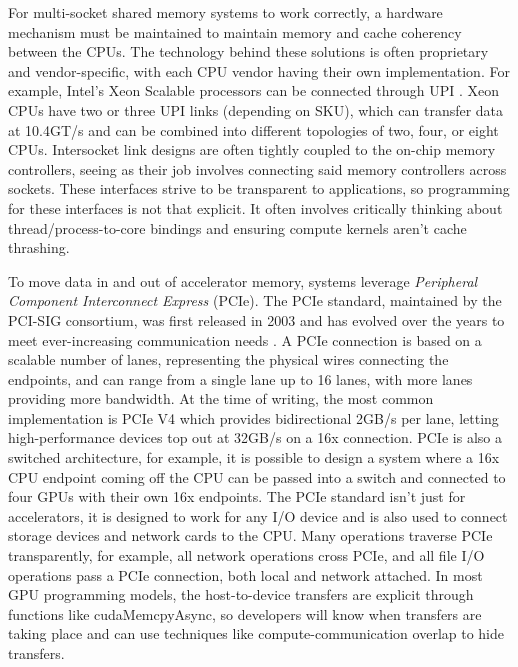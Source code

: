 For multi-socket shared memory systems to work correctly, a hardware mechanism must be maintained to maintain memory and cache coherency between the CPUs.  
The technology behind these solutions is often proprietary and vendor-specific, with each CPU vendor having their own implementation.
For example, Intel's Xeon Scalable processors can be connected through UPI \cite{XeonTechOverview}.
Xeon CPUs have two or three UPI links (depending on SKU), which can transfer data at 10.4GT/s and can be combined into different topologies of two, four, or eight CPUs.
Intersocket link designs are often tightly coupled to the on-chip memory controllers, seeing as their job involves connecting said memory controllers across sockets.
These interfaces strive to be transparent to applications, so programming for these interfaces is not that explicit. 
It often involves critically thinking about thread/process-to-core bindings and ensuring compute kernels aren't cache thrashing.

To move data in and out of accelerator memory, systems leverage \textit{Peripheral Component Interconnect Express} (PCIe).
The PCIe standard, maintained by the PCI-SIG consortium, was first released in 2003 and has evolved over the years to meet ever-increasing communication needs \cite{PCIeIntroPaper, PCIeV5Spec}.
A PCIe connection is based on a scalable number of lanes, representing the physical wires connecting the endpoints, and can range from a single lane up to 16 lanes, with more lanes providing more bandwidth.
At the time of writing, the most common implementation is PCIe V4 which provides bidirectional 2GB/s per lane, letting high-performance devices top out at 32GB/s on a 16x connection. 
PCIe is also a switched architecture, for example, it is possible to design a system where a 16x CPU endpoint coming off the CPU can be passed into a switch and connected to four GPUs with their own 16x endpoints.
The PCIe standard isn't just for accelerators, it is designed to work for any I/O device and is also used to connect storage devices and network cards to the CPU.
Many operations traverse PCIe transparently, for example, all network operations cross PCIe, and all file I/O operations pass a PCIe connection, both local and network attached.
In most GPU programming models, the host-to-device transfers are explicit through functions like cudaMemcpyAsync, so developers will know when transfers are taking place and can use techniques like compute-communication overlap to hide transfers.

